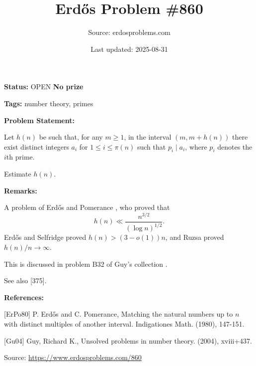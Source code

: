 \documentclass{article}
\title{Erd\H{o}s Problem \#860}
\date{Last updated: 2025-08-31}
\author{Source: erdosproblems.com}
\begin{document}
\maketitle

\noindent\textbf{Status:} OPEN \quad \textbf{No prize}

\noindent\textbf{Tags:} number theory, primes

\medskip
\noindent\textbf{Problem Statement:}

Let $h(n)$ be such that, for any $m\geq 1$, in the interval $(m,m+h(n))$ there exist distinct integers $a_i$ for $1\leq i\leq \pi(n)$ such that $p_i\mid a_i$, where $p_i$ denotes the $i$th prime. 

Estimate $h(n)$.

\bigskip
\noindent\textbf{Remarks:}

A problem of Erd\H{o}s and Pomerance \cite{ErPo80}, who proved that\[h(n) \ll \frac{n^{3/2}}{(\log n)^{1/2}}.\]Erd\H{o}s and Selfridge proved $h(n)>(3-o(1))n$, and Ruzsa proved $h(n)/n\to \infty$. 

This is discussed in problem B32 of Guy's collection \cite{Gu04}.

See also [375].

\bigskip
\noindent\textbf{References:}

[ErPo80] P. Erd\H{o}s and C. Pomerance, Matching the natural numbers up to $n$ with distinct multiples of another interval. Indigationes Math. (1980), 147-151.
 
 [Gu04] Guy, Richard K., Unsolved problems in number theory. (2004), xviii+437.

\bigskip
\noindent\small{Source: \url{https://www.erdosproblems.com/860}}
\end{document}
